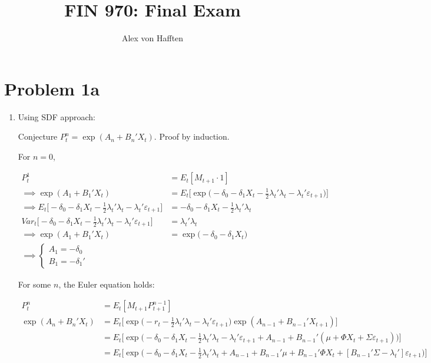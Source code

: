 \documentclass{article}
\title{FIN 970: Final Exam}
\author{Alex von Hafften}
\begin{document}
\maketitle

\section{Problem 1a}

\begin{enumerate}

\item Using SDF approach:

Conjecture $P_t^n = \exp(A_n + B_n'X_t)$. Proof by induction.

For $n=0$,

\begin{align*}
P_t^1 
&= 
E_t[M_{t+1} \cdot 1]\\
\implies\exp(A_1 + B_1'X_t) 
&= 
E_t \Bigg[ \exp \Bigg(-\delta_0 - \delta_1 X_t - \frac{1}{2} \lambda_t'\lambda_t - \lambda_t' \varepsilon_{t+1}\Bigg) \Bigg]\\
\implies E_t \Bigg[ -\delta_0 - \delta_1 X_t - \frac{1}{2} \lambda_t'\lambda_t - \lambda_t' \varepsilon_{t+1} \Bigg]
&= -\delta_0 -\delta_1 X_t - \frac{1}{2}\lambda_t'\lambda_t \\
Var_t\Bigg[ -\delta_0 - \delta_1 X_t - \frac{1}{2} \lambda_t'\lambda_t - \lambda_t' \varepsilon_{t+1} \Bigg]
&= \lambda_t'\lambda_t\\
\implies
\exp(A_1 + B_1'X_t) 
&= 
\exp \Bigg(-\delta_0 - \delta_1 X_t\Bigg) \\
\implies
\begin{cases}
A_1 = -\delta_0\\
B_1 = -\delta_1'
\end{cases}
\end{align*}

For some $n$, the Euler equation holds:

\begin{align*}
P_t^n &= E_t[M_{t+1} P_{t+1}^{n-1}]\\
\exp(A_{n} + B_{n}'X_{t})
&= E_t \Bigg[\exp \Bigg(-r_t - \frac{1}{2} \lambda_t'\lambda_t - \lambda_t' \varepsilon_{t+1}\Bigg) \exp(A_{n-1} + B_{n-1}'X_{t+1})\Bigg]\\
&= E_t \Bigg[\exp \Bigg(-\delta_0 - \delta_1 X_t - \frac{1}{2} \lambda_t'\lambda_t - \lambda_t' \varepsilon_{t+1} + A_{n-1} + B_{n-1}'(\mu + \Phi X_t + \Sigma \varepsilon_{t+1} ) \Bigg)\Bigg]\\
&= E_t \Bigg[\exp \Bigg(-\delta_0 - \delta_1 X_t - \frac{1}{2} \lambda_t'\lambda_t  + A_{n-1} + B_{n-1}'\mu + B_{n-1}'\Phi X_t + [B_{n-1}'\Sigma - \lambda_t'] \varepsilon_{t+1}  \Bigg)\Bigg]
\end{align*}


\end{enumerate}
\end{document}
